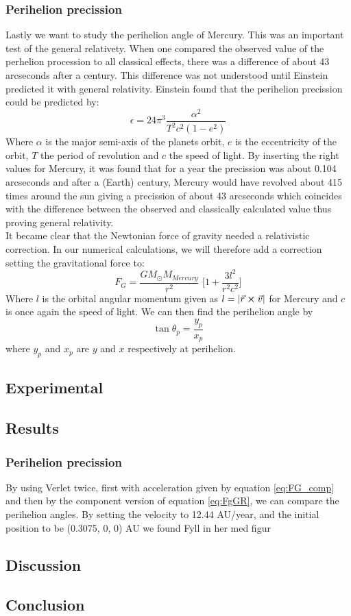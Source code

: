 \documentclass{article}
\newcommand{\husk}[1]{\color{red} #1 \color{black}}
\newcommand{\TomH}[1]{\Big[ #1 \Big]}
\begin{document}
\subsubsection*{Perihelion precission}
Lastly we want to study the perihelion angle of Mercury. This was an important test of the general relativety. When one compared the observed value of the perhelion procession to all classical effects, there was a difference of about 43 arcseconds after a century. This difference was not understood until Einstein predicted it with general relativity. Einstein found that the perihelion precission could be predicted by:
\begin{equation}
\epsilon = 24 \pi^3 \frac{\alpha^2}{T^2 c^2 (1 - e^2)}
\label{eq:perihelion}
\end{equation}
Where $\alpha$ is the major semi-axis of the planets orbit, $e$ is the eccentricity of the orbit, $T$ the period of revolution and $c$ the speed of light. By inserting the right values for Mercury, it was found that for a year the precission was about 0.104 arcseconds and after a (Earth) century, Mercury would have revolved about 415 times around the sun giving a precission of about 43 arcseconds which coincides with the difference between the observed and classically calculated value thus proving general relativity. \\
It became clear that the Newtonian force of gravity needed a relativistic correction. In our numerical calculations, we will therefore add a correction setting the gravitational force to:
\begin{equation}
F_G = \frac{G M_{\odot} M_{Mercury}}{r^2} \, \, \TomH{1 + \frac{3l^2}{r^2c^2}}
\label{eq:FgGR}
\end{equation}
Where $l$ is the orbital angular momentum given as $l = |\vec{r} \cross \vec{v}|$ for Mercury and $c$ is once again the speed of light.
We can then find the perihelion angle by
\begin{equation}
\tan \theta_p = \frac{y_p}{x_p}
\end{equation}
where $y_p$ and $x_p$ are $y$ and $x$ respectively at perihelion.
\subsection{Experimental}
\subsection{Results}
\subsubsection*{Perihelion precission}
By using Verlet twice, first with acceleration given by equation \eqref{eq:FG_comp} and then by the component version of equation \eqref{eq:FgGR}, we can compare the perihelion angles. By setting the velocity to 12.44 AU/year, and the initial position to be (0.3075, 0, 0) AU we found \husk{Fyll in her med figur}
\subsection{Discussion}
\subsection{Conclusion}
\end{document}
